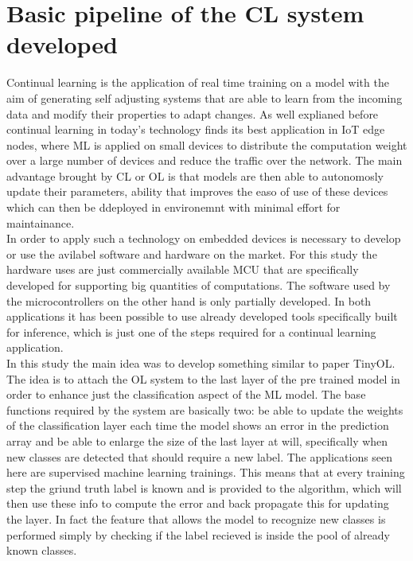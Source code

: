 \documentclass[12pt]{report}
\begin{document}
\section{Basic pipeline of the CL system developed}
Continual learning is the application of real time training on a model with the aim of generating self adjusting systems that are able to learn from the incoming data and modify their properties to adapt changes. As well explianed before continual learning in today's technology finds its best application in IoT edge nodes, where ML is applied on small devices to distribute the computation weight over a large number of devices and reduce the traffic over the network. The main advantage brought by CL or OL is that models are then able to autonomosly update their parameters, ability that improves the easo of use of these devices which can then be ddeployed in environemnt with minimal effort for maintainance. \\
In order to apply such a technology on embedded devices is necessary to develop or use the avilabel software and hardware on the market. For this study the hardware uses are just commercially available MCU that are specifically developed for supporting big quantities of computations. The software used by the microcontrollers on the other hand is only partially developed. In both applications it has been possible to use already developed tools specifically built for inference, which is just one of the steps required for a continual learning application. \\
In this study the main idea was to develop something similar to paper TinyOL. The idea is to attach the OL system to the last layer of the pre trained model in order to enhance just the classification aspect of the ML model. The base functions required by the system are basically two: be able to update the weights of the classification layer each time the model shows an error in the prediction array and be able to enlarge the size of the last layer at will, specifically when new classes are detected that should require a new label. The applications seen here are supervised machine learning trainings. This means that at every training step the griund truth label is known and is provided to the algorithm, which will then use these info to compute the error and back propagate this for updating the layer. In fact the feature that allows the model to recognize new classes is performed simply by checking if the label recieved is inside the pool of already known classes. \\
\end{document}

